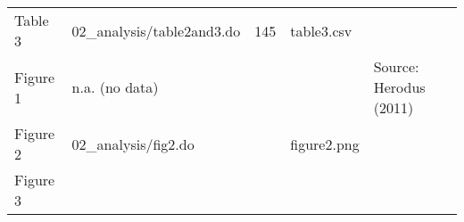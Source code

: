 \documentclass[
]{article}
\begin{document}
\begin{longtable}[]{@{}lllll@{}}
\begin{minipage}[t]{0.13\columnwidth}
Table 3\strut
\end{minipage} & \begin{minipage}[t]{0.18\columnwidth}\raggedright
02\_analysis/table2and3.do\strut
\end{minipage} & \begin{minipage}[t]{0.09\columnwidth}\raggedright
145\strut
\end{minipage} & \begin{minipage}[t]{0.23\columnwidth}\raggedright
table3.csv\strut
\end{minipage} & \begin{minipage}[t]{0.23\columnwidth}\raggedright
\strut
\end{minipage}\tabularnewline
\begin{minipage}[t]{0.13\columnwidth}\raggedright
Figure 1\strut
\end{minipage} & \begin{minipage}[t]{0.18\columnwidth}\raggedright
n.a. (no data)\strut
\end{minipage} & \begin{minipage}[t]{0.09\columnwidth}\raggedright
\strut
\end{minipage} & \begin{minipage}[t]{0.23\columnwidth}\raggedright
\strut
\end{minipage} & \begin{minipage}[t]{0.23\columnwidth}\raggedright
Source: Herodus (2011)\strut
\end{minipage}\tabularnewline
\begin{minipage}[t]{0.13\columnwidth}\raggedright
Figure 2\strut
\end{minipage} & \begin{minipage}[t]{0.18\columnwidth}\raggedright
02\_analysis/fig2.do\strut
\end{minipage} & \begin{minipage}[t]{0.09\columnwidth}\raggedright
\strut
\end{minipage} & \begin{minipage}[t]{0.23\columnwidth}\raggedright
figure2.png\strut
\end{minipage} & \begin{minipage}[t]{0.23\columnwidth}\raggedright
\strut
\end{minipage}\tabularnewline
\begin{minipage}[t]{0.13\columnwidth}\raggedright
Figure 3\strut
\end{minipage} & \begin{minipage}[t]{0.18\columnwidth}\raggedright

\end{minipage}
\end{longtable}
\end{document}
